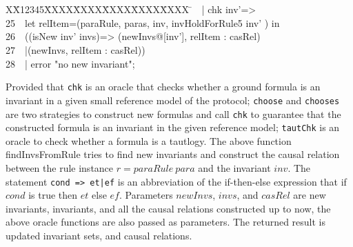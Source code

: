 \documentclass{llncs}
\newlength{\fminilength}
\newenvironment{fmini}[1][\linewidth]
  {\setlength{\fminilength}{#1\fboxsep-2\fboxrule}%
   \vspace{2ex}\noindent\begin{lrbox}{\fminibox}\begin{minipage}{\fminilength}%
   \mbox{ }\hfill\vspace{-2.5ex}}%
  {\end{minipage}\end{lrbox}\vspace{1ex}\hspace{0ex}%
   \framebox{\usebox{\fminibox}}}
\newenvironment{specification}
{\noindent\scriptsize
\tt\begin{fmini}\begin{tabbing}X\=X12345\=XXXX\=XXXX\=XXXX\=XXXX\=XXXX
\=\+\kill} {\end{tabbing}\normalfont\end{fmini}}
\def \twoSpaces {\ \ }
\begin{document}
\begin{specification}
24\twoSpaces   | chk inv'=>\\
25\twoSpaces      let relItem=(paraRule, paras, inv,  invHoldForRule5 inv'  ) in\\
26\twoSpaces        ((isNew inv' invs)=>        (newInvs@[inv'], relItem : casRel)\\
27\twoSpaces        |(newInvs,  relItem : casRel))\\
28\twoSpaces   | error "no new invariant";\\
\end{specification}

Provided that  {\tt chk} is an oracle that checks whether a ground
formula is an invariant in a given small reference model of the
protocol; {\tt choose} and {\tt chooses} are two strategies to
construct new formulas and call {\tt chk} to guarantee that the
constructed formula is an invariant in the given  reference model;
{\tt tautChk} is an oracle to check whether a formula is a tautlogy.
  The above function {\sf findInvsFromRule} tries to find new
invariants and construct the causal relation between the rule
instance $r=paraRule~ para$ and the invariant $inv$. The statement
{\tt cond => et|ef} is an abbreviation of the if-then-else
expression that if $cond$ is true then $et$ else $ef$. Parameters
$newInvs$, $invs$, and $casRel$ are new invariants, invariants, and
all the causal relations constructed up to now, the above oracle
functions are also passed as parameters. The returned result is
updated invariant sets, and causal relations.
%
\end{document}
